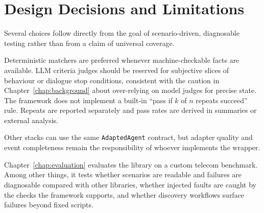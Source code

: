 \section{Design Decisions and Limitations}
\label{sec:limitations}

Several choices follow directly from the goal of scenario-driven, diagnosable testing rather than from a claim of universal coverage.

Deterministic matchers are preferred whenever machine-checkable facts are available. LLM criteria judges should be reserved for subjective slices of behaviour or dialogue stop conditions, consistent with the caution in Chapter~\ref{chap:background} about over-relying on model judges for precise state. The framework does not implement a built-in ``pass if $k$ of $n$ repeats succeed'' rule. Repeats are reported separately and pass rates are derived in summaries or external analysis.

Other stacks can use the same \texttt{AdaptedAgent} contract, but adapter quality and event completeness remain the responsibility of whoever implements the wrapper.

Chapter~\ref{chap:evaluation} evaluates the library on a custom telecom benchmark. Among other things, it tests whether scenarios are readable and failures are diagnosable compared with other libraries, whether injected faults are caught by the checks the framework supports, and whether discovery workflows surface failures beyond fixed scripts.
